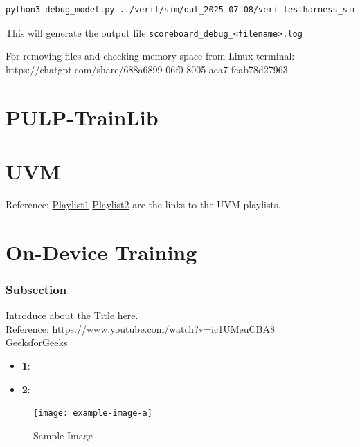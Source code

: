 \documentclass[12pt, a4paper]{article}
\begin{document}
\begin{lstlisting}[language=bash, frame=single, basicstyle=\ttfamily\footnotesize, numbers=none]
python3 debug_model.py ../verif/sim/out_2025-07-08/veri-testharness_sim/multiply.cv64a6_imafdc_sv39.log

\end{lstlisting}

This will generate the output file \texttt{scoreboard\_debug\_\textless filename\textgreater.log} 

For removing files and checking memory space from Linux terminal:
https://chatgpt.com/share/688a6899-06f0-8005-aea7-fcab78d27963

\section{PULP-TrainLib}

\section{UVM}
Reference: \href{https://youtube.com/playlist?list=PLuYB6t6povcLgoHWLJgk-VeMQ0Rscjw03&si=l-rjyvLkuttomYeC}{Playlist1}
\href{https://youtube.com/playlist?list=PLqPfWwayuBvNrr09dCweog1htCBLUbN4W&si=4vI1Fs_sgz-A0wXdC}{Playlist2} are the links to the UVM playlists.

\section{On-Device Training}

\subsubsection{Subsection}

Introduce about the \underline{Title} here. \\

Reference: \url{https://www.youtube.com/watch?v=ic1UMeuCBA8} \\
\href{https://www.geeksforgeeks.org/difference-between-gate-level-and-structural-verilog-hdl/}{GeeksforGeeks}

\begin{itemize}
    \item \textbf{1}: 
    \item \textbf{2}:   
\end{itemize}

\begin{figure}[h]   %
    \centering
    \texttt{[image: example-image-a]} %
    \caption{Sample Image}%
    \label{fig:veri1}
\end{figure}
\end{document}
